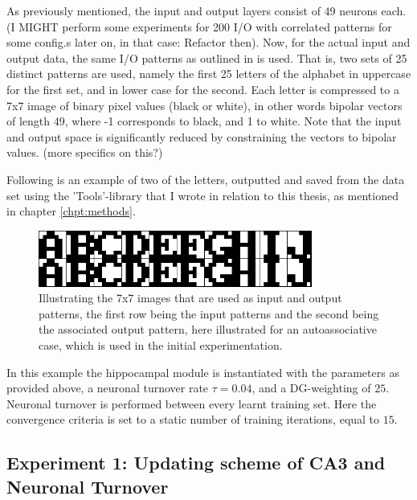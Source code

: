 As previously mentioned, the input and output layers consist of 49 neurons each. (I MIGHT perform some experiments for 200 I/O with correlated patterns for some config.s later on, in that case: Refactor then). Now, for the actual input and output data, the same I/O patterns as outlined in \citep{Hattori2010, Hattori2014} is used. That is, two sets of 25 distinct patterns are used, namely the first 25 letters of the alphabet in uppercase for the first set, and in lower case for the second. Each letter is compressed to a 7x7 image of binary pixel values (black or white), in other words bipolar vectors of length 49, where -1 corresponds to black, and 1 to white. Note that the input and output space is significantly reduced by constraining the vectors to bipolar values. (more specifics on this?)

Following is an example of two of the letters, outputted and saved from the data set using the 'Tools'-library that I wrote in relation to this thesis, as mentioned in chapter \ref{chpt:methods}.

\begin{figure}\label{fig:sample_letters}
    \centering
    \includegraphics[width=9cm]{fig/im_both.png}
    \caption{Illustrating the 7x7 images that are used as input and output patterns, the first row being the input patterns and the second being the associated output pattern, here illustrated for an autoassociative case, which is used in the initial experimentation.}
\end{figure}

In this example the hippocampal module is instantiated with the parameters as provided above, a neuronal turnover rate $\tau = 0.04$, and a DG-weighting of $25$. Neuronal turnover is performed between every learnt training set. Here the convergence criteria is set to a static number of training iterations, equal to $15$.

\subsection{Experiment 1: Updating scheme of CA3 and Neuronal Turnover}

